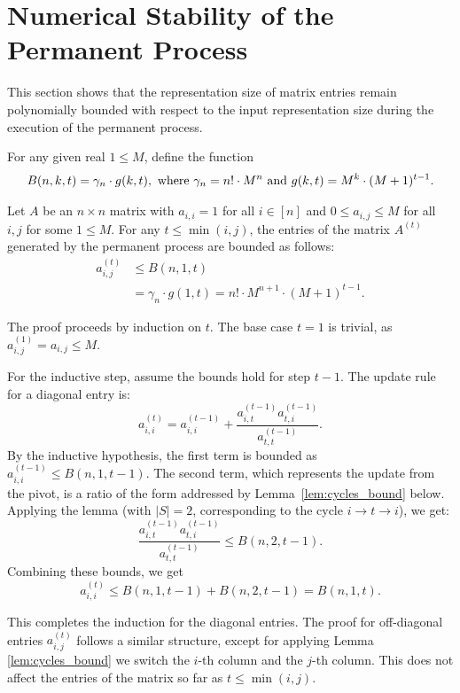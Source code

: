 \documentclass[11pt]{article}
\makeatletter
\theoremstyle{definition}
\newenvironment{proof}[1][\protect\proofname]{\par
	\normalfont\topsep6\p@\@plus6\p@\relax
	\trivlist
	\itemindent\parindent        %
	\item[\hskip\labelsep\scshape #1]\ignorespaces
}{%
	\endtrivlist\@endpefalse
}
\providecommand{\proofname}{Proof}
\makeatother
\begin{document}
\section{Numerical Stability of the Permanent Process} \label{sec:boundedness}
This section shows that the representation size of matrix entries remain polynomially bounded with respect to the input representation size during the execution of the permanent process. 
\begin{definition}
    For any given real $1\leq M$, define the function 
    \begin{align}
       B(n,k,t)=\gamma_n \cdot g(k,t), \textnormal{ where }\gamma_n = n!\cdot M^n \textnormal{ and } g(k,t)= M^k\cdot (M+1)^{t-1}. 
    \end{align}
\end{definition}
\begin{theorem} \label{thm:boundedness}
Let $A$ be an $n \times n$ matrix with $a_{i,i} = 1$ for all $i \in [n]$ and $0\leq a_{i,j} \le M$ for all $i,j$ for some $1\leq M$. For any $t \le \min(i, j)$, the entries of the matrix $A^{(t)}$ generated by the permanent process are bounded as follows:
\begin{align*}
    a_{i,j}^{(t)} &\le B(n,1,t) \\
    &=\gamma_n \cdot g(1,t)=n!\cdot M^{n+1}\cdot (M+1)^{t-1}.
\end{align*}
\end{theorem}
\begin{proof}
The proof proceeds by induction on $t$. The base case $t=1$ is trivial, as $a_{i,j}^{(1)} = a_{i,j} \le M$.

For the inductive step, assume the bounds hold for step $t-1$. The update rule for a diagonal entry is:
\begin{equation*}
    a^{(t)}_{i,i} = a^{(t-1)}_{i,i} + \frac{a^{(t-1)}_{i,t} a^{(t-1)}_{t,i}}{a^{(t-1)}_{t,t}}.
\end{equation*}
By the inductive hypothesis, the first term is bounded as $a^{(t-1)}_{i,i} \le B(n,1,t-1)$. The second term, which represents the update from the pivot, is a ratio of the form addressed by Lemma~\ref{lem:cycles_bound} below. Applying the lemma (with $|S|=2$, corresponding to the cycle $i \to t \to i$), we get:
\begin{equation*}
    \frac{a^{(t-1)}_{i,t} a^{(t-1)}_{t,i}}{a^{(t-1)}_{t,t}} \le B(n,2,t-1).
\end{equation*}
Combining these bounds, we get
\begin{equation*}
    a^{(t)}_{i,i} \le B(n,1, t-1) + B(n,2, t-1)= B(n,1,t).
\end{equation*}

This completes the induction for the diagonal entries. The proof for off-diagonal entries $a_{i,j}^{(t)}$ follows a similar structure, except for applying Lemma \ref{lem:cycles_bound} we switch the $i$-th column and the $j$-th column. This does not affect the entries of the matrix so far as $t \leq \min(i,j)$. 
\end{proof}
\end{document}
